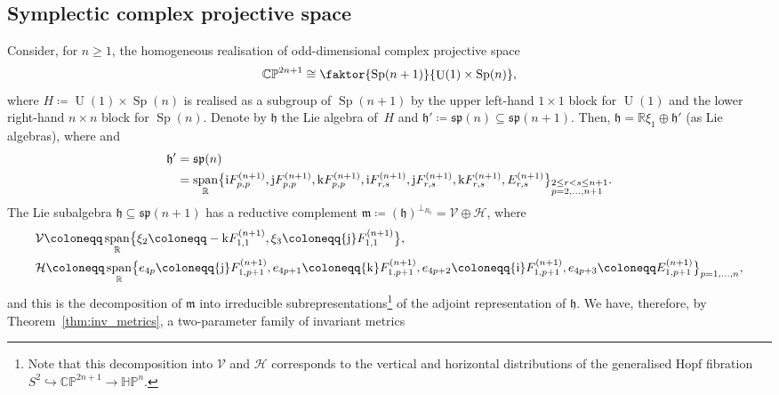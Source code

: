 \documentclass[pdftex]{sigma}
\numberwithin{equation}{section}
\DeclareMathOperator{\vecspan}{span}
\DeclareMathOperator{\Sp}{Sp}
\DeclareMathOperator{\U}{U}
\begin{document}
		\subsection{Symplectic complex projective space}
		
		Consider, for $n \geq 1$, the homogeneous realisation of odd-dimensional complex projective space
		\[
		\mathbb{CP}^{2n+1} \cong \faktor{\Sp(n+1)}{ \U(1) \times \Sp(n)} ,
		\]
where $H \coloneqq \U(1) \times \Sp(n)$ is realised as a subgroup of $\Sp(n+1)$ by the upper left-hand $1 \times 1$ block for $\U(1)$ and the lower right-hand $n \times n$ block for $\Sp(n)$. Denote by $\mathfrak{h}$ the Lie algebra of~$H$ and $\mathfrak{h}' \coloneqq \mathfrak{sp}(n) \subseteq \mathfrak{sp}(n+1)$. Then,
	$
			\mathfrak{h} = \mathbb{R}\xi_1 \oplus \mathfrak{h}' $ (as Lie algebras),
		where  and
			\begin{align*}
\mathfrak{h}' &= \mathfrak{sp}(n) \\
&= \vecspan_{\mathbb{R}} \bigl\{ {\rm i} F_{p,p}^{(n+1)}, {\rm j} F_{p,p}^{(n+1)}, {\rm k} F_{p,p}^{(n+1)}, {\rm i} F_{r,s}^{(n+1)}, {\rm j} F_{r,s}^{(n+1)}, {\rm k} F_{r,s}^{(n+1)}, E_{r,s}^{(n+1)} \bigr\}_{\begin{subarray}{l} 2 \leq r < s \leq n+1 \\ p = 2 , \dots, n+1 \end{subarray}} .
\end{align*}
		The Lie subalgebra $\mathfrak{h} \subseteq \mathfrak{sp}(n+1)$ has a reductive complement $\mathfrak{m} \coloneqq ( \mathfrak{h})^{\perp_{B_0}} = \mathcal{V} \oplus \mathcal{H}$, where
		\begin{align*}
			&\mathcal{V} \coloneqq \vecspan_{\mathbb{R}} \bigl\{ \xi_2 \coloneqq -{\rm k} F_{1,1}^{(n+1)}, \xi_3 \coloneqq {\rm j} F_{1,1}^{(n+1)} \bigr\} , \\
			&\mathcal{H} \coloneqq \vecspan_{\mathbb{R}} \bigl\{e_{4p} \coloneqq {\rm j} F_{1,p+1}^{(n+1)}, e_{4p+1} \coloneqq {\rm k} F_{1,p+1}^{(n+1)}, e_{4p+2} \coloneqq {\rm i} F_{1,p+1}^{(n+1)}, e_{4p+3} \coloneqq E_{1,p+1}^{(n+1)}\bigr\}_{p = 1, \dots, n} ,
		\end{align*}
		and this is the decomposition of $\mathfrak{m}$ into irreducible subrepresentations\footnote{Note that this decomposition into $\mathcal{V}$ and $\mathcal{H}$ corresponds to the vertical and horizontal distributions of the generalised Hopf fibration $S^2 \hookrightarrow \mathbb{CP}^{2n+1} \to \mathbb{HP}^n$.} of the adjoint representation of $\mathfrak{h}$. We have, therefore, by Theorem~\ref{thm:inv_metrics}, a two-parameter family of invariant metrics
\end{document}

